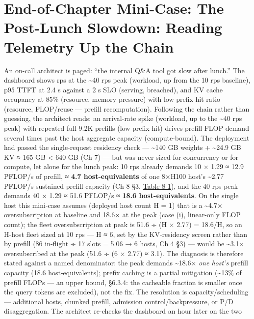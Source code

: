 \section{End-of-Chapter Mini-Case: The Post-Lunch Slowdown: Reading
Telemetry Up the
Chain}\label{end-of-chapter-mini-case-the-post-lunch-slowdown-reading-telemetry-up-the-chain}

An on-call architect is paged: ``the internal Q\&A tool got slow after
lunch.'' The dashboard shows rps at the \textasciitilde40 rps peak
(workload, up from the 10 rps baseline), p95 TTFT at 2.4 s against a 2 s
SLO (serving, breached), and KV cache occupancy at 85\% (resource,
memory pressure) with low prefix-hit ratio (resource, FLOP/reuse ---
prefill recomputation). Following the chain rather than guessing, the
architect reads: an arrival-rate spike (workload, up to the
\textasciitilde40 rps peak) with repeated full 9.2K prefills (low prefix
hit) drives prefill FLOP demand several times past the host aggregate
capacity (compute-bound). The deployment had passed the single-request
residency check --- \textasciitilde140 GB weights + \textasciitilde24.9
GB KV ≈ 165 GB \textless{} 640 GB (Ch 7) --- but was never sized for
concurrency or for compute, let alone for the lunch peak: 10 rps already
demands 10 × 1.29 ≈ 12.9 PFLOP/s of prefill, ≈ \textbf{4.7
host-equivalents} of one 8×H100 host's \textasciitilde2.77 PFLOP/s
sustained prefill capacity (Ch 8 §3, \hyperref[tab:8.1]{Table 8-1}), and the 40 rps peak
demands 40 × 1.29 ≈ 51.6 PFLOP/s ≈ \textbf{18.6 host-equivalents}. On
the single host this mini-case assumes (deployed host count H = 1) that
is a \textasciitilde4.7× oversubscription at baseline and 18.6× at the
peak (case (i), linear-only FLOP count); the fleet oversubscription at
peak is 51.6 ÷ (H × 2.77) = 18.6/H, so an H-host fleet sized at 10 rps
--- H ≈ 6, set by the KV-residency screen rather than by prefill (86
in-flight ÷ 17 slots = 5.06 → 6 hosts, Ch 4 §3) --- would be
\textasciitilde3.1× oversubscribed at the peak (51.6 ÷ (6 × 2.77) ≈
3.1). The diagnosis is therefore stated against a named denominator: the
peak demands \textasciitilde18.6× \emph{one host's} prefill capacity
(18.6 host-equivalents); prefix caching is a partial mitigation
(\textasciitilde13\% of prefill FLOPs --- an upper bound, §6.3.4: the
cacheable fraction is smaller once the query tokens are excluded), not
the fix. The resolution is capacity/scheduling --- additional hosts,
chunked prefill, admission control/backpressure, or P/D disaggregation.
The architect re-checks the dashboard an hour later on the two
